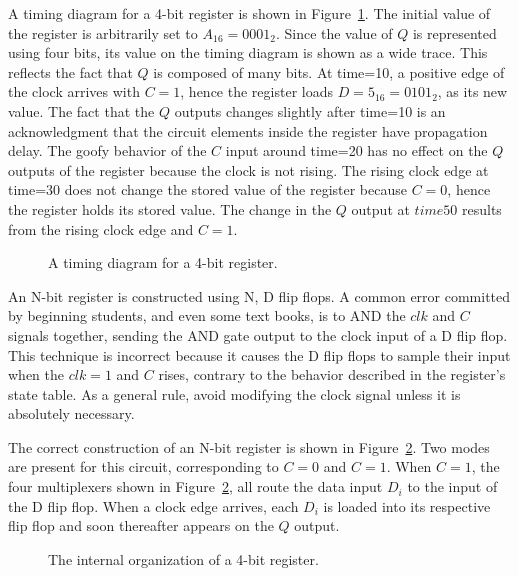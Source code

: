     A timing diagram for a 4-bit register is shown in Figure~\ref{fig:sequentialBBRegTime}.
    The initial value of the register is arbitrarily set to $A_{16}=0001_2$.
    Since the value of $Q$ is represented using four bits, its value on the timing
    diagram is shown as a wide trace.  This reflects the fact that $Q$ is
    composed of many bits.  At time=10, a positive edge of the clock arrives
    with $C=1$, hence the register loads $D=5_{16}=0101_2$, as its new value.
    The fact that the $Q$ outputs changes slightly after time=10 is an
    acknowledgment that the circuit elements inside the register have
    propagation delay.  The goofy behavior of the $C$ input around time=20 has
    no effect on the $Q$ outputs of the register because the clock is not rising.
    The rising clock edge at time=30 does not change the stored value of the
    register because $C=0$, hence the register holds its stored value.  The change
    in the $Q$ output at $time 50$ results from the rising clock edge and $C=1$.

    \begin{figure}[ht]
        \caption{A timing diagram for a 4-bit register.}
        \label{fig:sequentialBBRegTime}
    \end{figure}

An N-bit register is constructed using N, D flip flops.  A common error
committed by beginning students, and even some text books, is to AND the
$clk$ and $C$ signals together, sending the AND gate output to the
clock input of a D flip
flop.  This technique is incorrect because it causes the D flip flops to
sample their input when the $clk = 1$ and $C$ rises, contrary to the behavior
described in the register's state table.  As a general rule,
avoid modifying the clock signal unless it is absolutely necessary.

The correct construction of an N-bit register is shown in
Figure~\ref{fig:sequentialBBreg}.   Two modes are present for this circuit,
corresponding to $C=0$ and $C=1$.  When $C=1$, the four multiplexers
shown in Figure~\ref{fig:sequentialBBreg}, all route the data input $D_i$
to the input of the D flip flop.  When a clock edge arrives,
each $D_i$ is loaded into its respective flip flop and
soon thereafter appears on the $Q$ output.

\begin{figure}[ht]
    \caption{The internal organization of a 4-bit register.}
    \label{fig:sequentialBBreg}
\end{figure}

